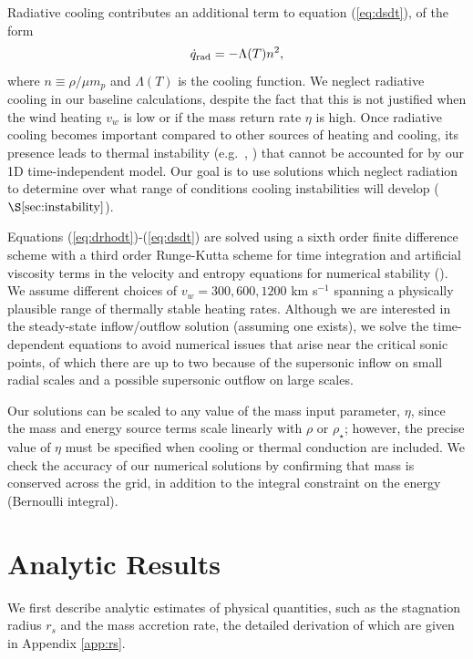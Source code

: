\documentclass[usenatbib,fleqn]{mn2e}
\newcommand{\rs}{r_s}
\newcommand{\vwO}{v_{w}}
\begin{document}
 Radiative cooling contributes an additional term to equation
 (\ref{eq:dsdt}), of the form
\begin{equation}
\dot{q}_{\rm rad} = -\Lambda(T)n^{2},
\label{eq:qdot_rad}
\end{equation}
where $n \equiv \rho/\mu m_p$ and $\Lambda(T)$ is the cooling
function.  We neglect radiative cooling in our baseline calculations,
despite the fact that this is not justified when the wind heating
$\vwO$ is low or if the mass return rate $\eta$ is high.  Once
radiative cooling becomes important compared to other sources of
heating and cooling, its presence leads to thermal instability
(e.g.~\citealt{McCourt+12}, \citealt{Li&Bryan14a}) that cannot be
accounted for by our 1D time-independent model.  Our goal is to use
solutions which neglect radiation to determine over what range of
conditions cooling instabilities will develop
($\S\ref{sec:instability}$).

Equations (\ref{eq:drhodt})-(\ref{eq:dsdt}) 
are solved using a sixth
order finite difference scheme with a third order Runge-Kutta scheme
for time integration and artificial viscosity terms in the velocity
and entropy equations for numerical stability
(\citealt{Brandenburg:2003a}).  We assume different choices of $v_{w}
= 300, 600, 1200$ km s$^{-1}$ spanning a physically plausible range of
thermally stable heating rates.  Although we are
interested in the steady-state inflow/outflow solution (assuming one
exists), we solve the time-dependent equations to avoid numerical
issues that arise near the critical sonic points, of which there are
up to two because of the supersonic inflow on small radial scales and
a possible supersonic outflow on large scales.  

Our
solutions can be scaled to any value of the mass input parameter,
$\eta$, since the mass and energy source terms scale linearly with
$\rho$ or $\rho_{\star}$; however, the precise value of $\eta$ must be
specified when cooling or thermal conduction are included.  We check the accuracy of
our numerical solutions by confirming that mass is conserved across
the grid, in addition to the integral constraint on the energy
(Bernoulli integral).



\section{Analytic Results}
\label{sec:results}

We first describe analytic estimates of physical quantities, such as
the stagnation radius $\rs$ and the mass accretion rate, the detailed
derivation of which are given in Appendix \ref{app:rs}.  
\end{document}
